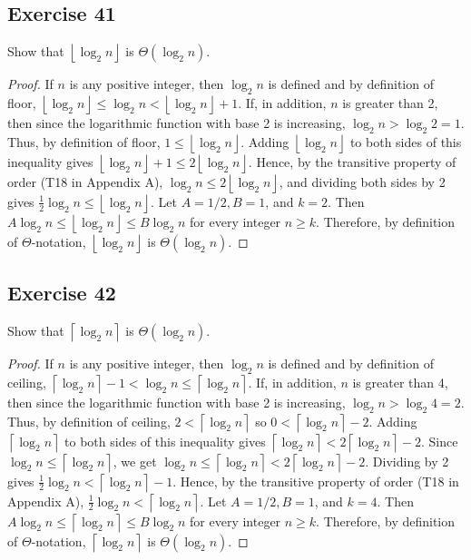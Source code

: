 \documentclass[14pt]{extarticle}
\newcommand{\floor}[1]{{\left\lfloor#1\right\rfloor}}
\newcommand{\ceil}[1]{{\left\lceil#1\right\rceil}}
\begin{document}
\subsection{Exercise 41}
Show that \(\floor{\log_2 n}\) is \(\Theta(\log_2 n)\).
\begin{proof}
If \(n\) is any positive integer, then \(\log_2 n\) is defined and by definition of floor, \(\floor{\log_2 n}\leq \log_2 n < 
\floor{\log_2 n} + 1\). If, in addition, \(n\) is greater than 2, then since the logarithmic function with base 2 is 
increasing, \(\log_2 n > \log_2 2 = 1\). Thus, by definition of floor, \(1 \leq \floor{\log_2 n}\). Adding \(\floor{\log_2 
n}\) to both sides of this inequality gives \(\floor{\log_2 n} + 1 \leq 2 \floor{\log_2 n}\). Hence, by the transitive 
property of order (T18 in Appendix A), \(\log_2 n \leq 2 \floor{\log_2 n}\), and dividing both sides by 2 gives 
\(\frac{1}{2} \log_2 n \leq \floor{\log_2 n}\). Let \(A = 1/2, B = 1\), and \(k = 2\). Then \(A \log_2 n \leq \floor{\log_2 
n} \leq B \log_2 n\) for every integer \(n \geq k\). Therefore, by definition of \(\Theta\)-notation, 
\(\floor{\log_2 n}\) is \(\Theta(\log_2 n)\).
\end{proof}

\subsection{Exercise 42}
Show that \(\ceil{\log_2 n}\) is \(\Theta(\log_2 n)\).
\begin{proof}
If \(n\) is any positive integer, then \(\log_2 n\) is defined and by definition of ceiling, \(\ceil{\log_2 n} - 1 < \log_2 n 
\leq \ceil{\log_2 n}\). If, in addition, \(n\) is greater than 4, then since the logarithmic function with base 2 is 
increasing, \(\log_2 n > \log_2 4 = 2\). Thus, by definition of ceiling, \(2<\ceil{\log_2 n}\) so \(0<\ceil{\log_2 n}- 2\). 
Adding \(\ceil{\log_2 n}\) to both sides of this inequality gives \(\ceil{\log_2 n} < 2 \ceil{\log_2 n}- 2\). Since 
\(\log_2 n \leq \ceil{\log_2 n}\), we get \(\log_2 n \leq \ceil{\log_2 n} < 2 \ceil{\log_2 n}- 2\). Dividing by 2 gives 
\(\frac{1}{2}\log_2 n < \ceil{\log_2 n} - 1\). Hence, by the transitive property of order (T18 in Appendix A), 
\(\frac{1}{2} \log_2 n < \ceil{\log_2 n}\). Let \(A = 1/2, B = 1\), and \(k = 4\). Then \(A \log_2 n \leq \ceil{\log_2 n} 
\leq B \log_2 n\) for every integer \(n \geq k\). Therefore, by definition of \(\Theta\)-notation,  \(\ceil{\log_2 n}\) is 
\(\Theta(\log_2 n)\).
\end{proof}
\end{document}
